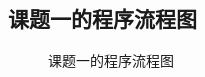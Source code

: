 \documentclass[UTF8,titlepage]{ctexart}
\numberwithin{figure}{section}
\begin{document}
\subsection{课题一的程序流程图}
\begin{figure}[H]
\centering
 \caption{课题一的程序流程图}
 \label{}
\end{figure}
\end{document}

